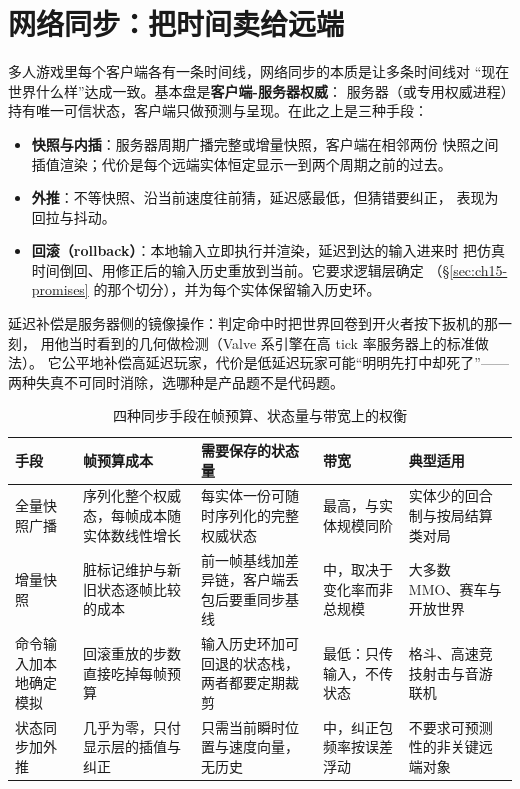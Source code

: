 \documentclass[12pt,a4paper,fontset=fandol]{ctexbook}
\begin{document}
\section{网络同步：把时间卖给远端}
\label{sec:ch15-net}

多人游戏里每个客户端各有一条时间线，网络同步的本质是让多条时间线对
``现在世界什么样''达成一致。基本盘是\textbf{客户端-服务器权威}：
服务器（或专用权威进程）持有唯一可信状态，客户端只做预测与呈现。在此之上是三种手段：

\begin{itemize}
  \item \textbf{快照与内插}：服务器周期广播完整或增量快照，客户端在相邻两份
        快照之间插值渲染；代价是每个远端实体恒定显示一到两个周期之前的过去。
  \item \textbf{外推}：不等快照、沿当前速度往前猜，延迟感最低，但猜错要纠正，
        表现为回拉与抖动。
  \item \textbf{回滚（rollback）}：本地输入立即执行并渲染，延迟到达的输入进来时
        把仿真时间倒回、用修正后的输入历史重放到当前。它要求逻辑层确定
        （\S\ref{sec:ch15-promises} 的那个切分），并为每个实体保留输入历史环。
\end{itemize}

延迟补偿是服务器侧的镜像操作：判定命中时把世界回卷到开火者按下扳机的那一刻，
用他当时看到的几何做检测（Valve 系引擎在高 tick 率服务器上的标准做法）。
它公平地补偿高延迟玩家，代价是低延迟玩家可能``明明先打中却死了''——两种失真不可同时消除，选哪种是产品题不是代码题。

\begin{table}[htbp]
\centering
\caption{四种同步手段在帧预算、状态量与带宽上的权衡}
\label{tab:ch15-nettrade}
\begin{tabular}{>{\raggedright\arraybackslash}p{} >{\raggedright\arraybackslash}p{} >{\raggedright\arraybackslash}p{} >{\raggedright\arraybackslash}p{} >{\raggedright\arraybackslash}p{}}
\toprule
手段 & 帧预算成本 & 需要保存的状态量 & 带宽 & 典型适用 \\
\midrule
全量快照广播 & 序列化整个权威态，每帧成本随实体数线性增长 & 每实体一份可随时序列化的完整权威状态 & 最高，与实体规模同阶 & 实体少的回合制与按局结算类对局 \\
增量快照 & 脏标记维护与新旧状态逐帧比较的成本 & 前一帧基线加差异链，客户端丢包后要重同步基线 & 中，取决于变化率而非总规模 & 大多数 MMO、赛车与开放世界 \\
命令输入加本地确定模拟 & 回滚重放的步数直接吃掉每帧预算 & 输入历史环加可回退的状态栈，两者都要定期裁剪 & 最低：只传输入，不传状态 & 格斗、高速竞技射击与音游联机 \\
状态同步加外推 & 几乎为零，只付显示层的插值与纠正 & 只需当前瞬时位置与速度向量，无历史 & 中，纠正包频率按误差浮动 & 不要求可预测性的非关键远端对象 \\
\bottomrule
\end{tabular}
\end{table}
\end{document}
